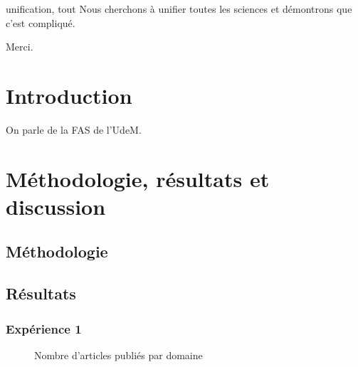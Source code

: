 \documentclass[phd]{dissertum}
\date{Août}{2023}
\begin{document}
  \pagetitre
  \pagejury

  \begin{resume}{unification, tout}
    Nous cherchons à unifier toutes les sciences et démontrons que c'est compliqué.
  \end{resume}

  \begin{abstract}{unification, everything}
    We try to unify all sciences and prove that it is complicated.
  \end{abstract}

  \matieres

    \begin{acronym}
    \end{acronym}


    Merci.

    \lipsum[1-2]


  \chapter{Introduction}
    On parle de la \ac{FAS} de l'\ac{UdeM}.
    \lipsum[3-6]

  \chapter{Méthodologie, résultats et discussion}
    \lipsum[7-8]\cite{knuth84}
    \section{Méthodologie}
      \lipsum[9-10]
    \section{Résultats}
      \lipsum[11-12]
      \subsection{Expérience 1}
        \lipsum[13]
        \begin{figure}
          \centering
          \caption{Nombre d'articles publiés par domaine}
        \end{figure}
\end{document}
